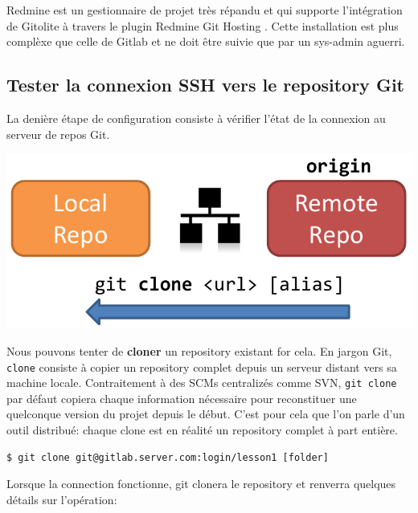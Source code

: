 \documentclass{../../common/tufte-latex/tufte-handout}
\begin{document}
\noindent Redmine est un gestionnaire de projet très répandu et qui supporte l'intégration de Gitolite à travers le plugin Redmine Git Hosting . Cette installation est plus complèxe que celle de Gitlab et ne doit être suivie que par un sys-admin aguerri.

\subsection{Tester la connexion SSH vers le repository Git}

La denière étape de configuration consiste à vérifier l'état de la connexion au serveur de repos Git.

\begin{marginfigure}%
  \centering
  \includegraphics[width=\linewidth]{gitclone-schema.pdf}
  \label{fig:gitclone}
\end{marginfigure}
Nous pouvons tenter de \textbf{cloner} un repository existant for cela.
En jargon Git, \texttt{clone} consiste à copier un repository complet depuis un serveur distant vers sa machine locale.
Contraitement à des SCMs centralizés comme SVN, \texttt{git clone} par défaut copiera chaque information nécessaire pour reconstituer une quelconque version du projet depuis le début.
C'est pour cela que l'on parle d'un outil distribué: chaque clone est en réalité un repository complet à part entière.

\begin{lstlisting}[style=BashInputStyle]
  $ git clone git@gitlab.server.com:login/lesson1 [folder]
\end{lstlisting}

\noindent Lorsque la connection fonctionne, git clonera le repository et renverra quelques détails sur l'opération:
\end{document}
